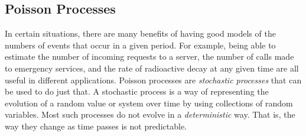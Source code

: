 \documentclass[a4paper,11pt]{article}
\begin{document}
\subsection{Poisson Processes}
\label{sec-2-2}

In certain situations, there are many benefits of having good models of the
numbers of events that occur in a given period. For example, being able to
estimate the number of incoming requests to a server, the number of calls made
to emergency services, and the rate of radioactive decay at any given time are
all useful in different applications. Poisson processes are \emph{stochastic
processes} that can be used to do just that. A stochastic process is a way of
representing the evolution of a random value or system over time by using
collections of random variables. Most such processes do not evolve in a
\emph{deterministic} way. That is, the way they change as time passes is not
predictable.
\end{document}
